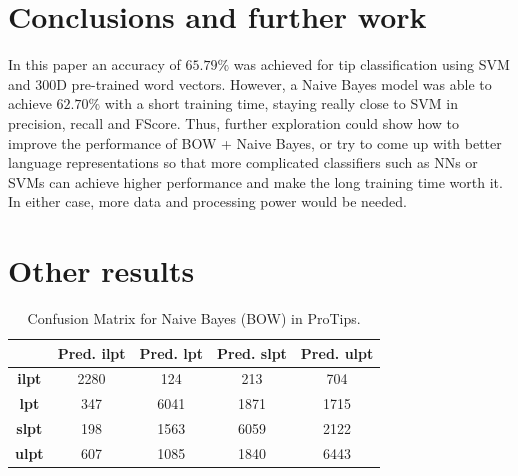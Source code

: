 \documentclass[11pt,a4paper]{article}
\begin{document}
\section{Conclusions and further work}
\label{sec:conclusions}

In this paper an accuracy of $65.79\%$ was achieved for tip classification using SVM
and $300$D pre-trained word vectors. However, a Naive Bayes model was able to
achieve $62.70\%$ with a short training time, staying really close to SVM in precision,
recall and FScore. Thus, further exploration could show how
to improve the performance of BOW + Naive Bayes, or try to come up with better
language representations so that more complicated classifiers such as NNs
or SVMs can achieve higher performance and make the long training time worth it.\\
In either case, more data and processing power would be needed.

\nocite{*}



\appendix

\section{Other results}
\label{sec:other_results}
\begin{table}[h!]
\centering
\begin{tabular}{c|c|c|c|c|}
\cline{2-5}
                                                            & \cellcolor[HTML]{EFEFEF}\textbf{Pred. ilpt} & \cellcolor[HTML]{EFEFEF}\textbf{Pred. lpt} & \cellcolor[HTML]{EFEFEF}\textbf{Pred. slpt} & \cellcolor[HTML]{EFEFEF}\textbf{Pred. ulpt} \\ \hline
\multicolumn{1}{|c|}{\cellcolor[HTML]{EFEFEF}\textbf{ilpt}} & 2280                                        & 124                                        & 213                                         & 704                                         \\ \hline
\multicolumn{1}{|c|}{\cellcolor[HTML]{EFEFEF}\textbf{lpt}}  & 347                                         & 6041                                       & 1871                                        & 1715                                        \\ \hline
\multicolumn{1}{|c|}{\cellcolor[HTML]{EFEFEF}\textbf{slpt}} & 198                                         & 1563                                       & 6059                                        & 2122                                        \\ \hline
\multicolumn{1}{|c|}{\cellcolor[HTML]{EFEFEF}\textbf{ulpt}} & 607                                         & 1085                                       & 1840                                        & 6443                                        \\ \hline
\end{tabular}
\caption{Confusion Matrix for Naive Bayes (BOW) in ProTips.}
\label{table:nb_cf}
\end{table}
\end{document}
